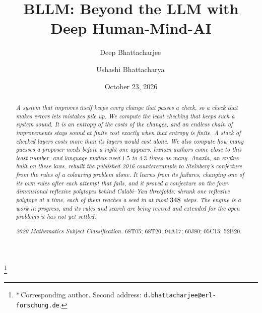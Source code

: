 \documentclass[aps,prd,twocolumn,superscriptaddress,nofootinbib,longbibliography,floatfix,showkeys,amsmath,amssymb,10pt]{revtex4-2}
\theoremstyle{plain}
\theoremstyle{definition}
\theoremstyle{plain}
\begin{document}
\title{BLLM: Beyond the LLM with Deep Human-Mind-AI}

\author{Deep Bhattacharjee\,}
\thanks{$*$\,Corresponding author. Second address: \nolinkurl{d.bhattacharjee@erl-forschung.de}.}

\author{Ushashi Bhattacharya\,}

\date{October 23, 2026}

\begin{abstract}
\itshape
A system that improves itself keeps every change that passes a check, so a check that makes errors lets mistakes pile up. We compute the least checking that keeps such a system sound. It is an entropy of the costs of the changes, and an endless chain of improvements stays sound at finite cost exactly when that entropy is finite. A stack of checked layers costs more than its layers would cost alone. We also compute how many guesses a proposer needs before a right one appears: human authors come close to this least number, and language models need $1.5$ to $4.3$ times as many. Anaxia, an engine built on these laws, rebuilt the published 2016 counterexample to Steinberg's conjecture from the rules of a colouring problem alone. It learns from its failures, changing one of its own rules after each attempt that fails, and it proved a conjecture on the four-dimensional reflexive polytopes behind Calabi--Yau threefolds: shrunk one reflexive polytope at a time, each of them reaches a seed in at most $348$ steps. The engine is a work in progress, and its rules and search are being revised and extended for the open problems it has not yet settled.
\par\medskip\upshape\noindent\textit{2020 Mathematics Subject Classification.} 68T05; 68T20; 94A17; 60J80; 05C15; 52B20.
\end{abstract}


\maketitle
\makeatletter\renewcommand\l@subsection[2]{}\renewcommand\l@subsubsection[2]{}\makeatother
\onecolumngrid
\tableofcontents
\twocolumngrid
\end{document}
